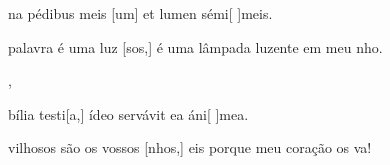 {    {\item {}na pédibus meis [um] et lumen sémi[ ]{me}is.}%
        {\item {} palavra é uma luz [sos,] é uma lâmpada luzente em meu nho.},
    {\item {}bília testi[a,] ídeo servávit ea áni[ ]{me}a.}%
        {\item {}vilhosos são os vossos [nhos,] eis porque meu coração os va!}
}